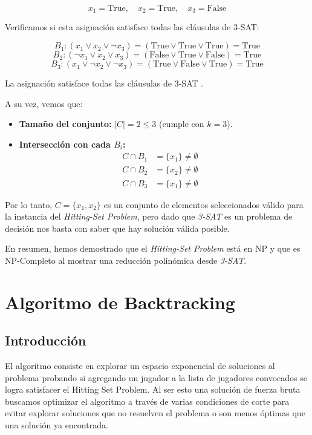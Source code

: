 \documentclass{estilo}
\begin{document}
\[ x_1 = \text{True}, \quad x_2 = \text{True}, \quad x_3 = \text{False} \]

Verificamos si esta asignación satisface todas las cláusulas de 3-SAT:

\[ B_1: (x_1 \lor x_2 \lor \neg x_3) = (\text{True} \lor \text{True} \lor \text{True}) = \text{True} \]
\[ B_2: (\neg x_1 \lor x_2 \lor x_3) = (\text{False} \lor \text{True} \lor \text{False}) = \text{True} \]
\[ B_3: (x_1 \lor \neg x_2 \lor \neg x_3) = (\text{True} \lor \text{False} \lor \text{True}) = \text{True} \]

La asignación satisface todas las cláusulas de 3-SAT \checkmark.

\newpage

A su vez, vemos que:
\begin{itemize}
    \item \textbf{Tamaño del conjunto:} \(|C| = 2 \leq 3\) (cumple con \(k = 3\)).
    \item \textbf{Intersección con cada \(B_i\):}
        \begin{align*}
            C \cap B_1 & = \{x_1\} \neq \emptyset \\
            C \cap B_2 & = \{x_2\} \neq \emptyset \\
            C \cap B_3 & = \{x_1\} \neq \emptyset \quad
        \end{align*}
\end{itemize}


Por lo tanto, \(C = \{x_1, x_2\}\) es un conjunto de elementos seleccionados válido para la instancia del \textit{Hitting-Set Problem}, pero dado que \textit{3-SAT} es un problema de decisión nos basta con saber que hay solución válida posible.

En resumen, hemos demostrado que el \textit{Hitting-Set Problem} está en NP y que es NP-Completo al mostrar una reducción polinómica desde \textit{3-SAT}.

\section{Algoritmo de Backtracking}

\subsection{Introducción}
El algoritmo consiste en explorar un espacio exponencial de soluciones al problema probando si agregando un jugador a la lista de jugadores convocados se logra satisfacer el Hitting Set Problem. Al ser esto una solución de fuerza bruta buscamos optimizar el algoritmo a través de varias condiciones de corte para evitar explorar soluciones que no resuelven el problema o son menos óptimas que una solución ya encontrada. 
\end{document}
